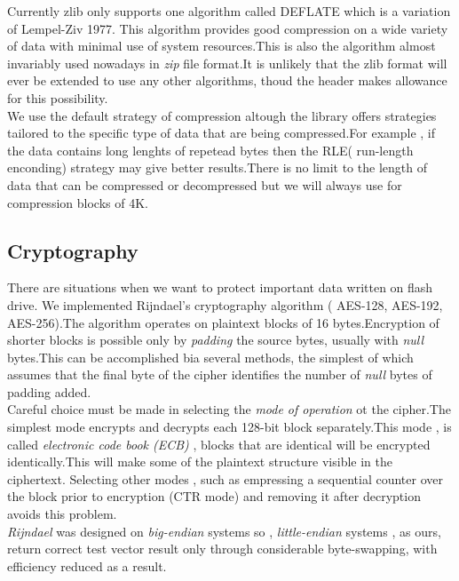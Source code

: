 \documentclass[conference]{IEEEtran}
\begin{document}
Currently zlib only supports one algorithm called DEFLATE which is a variation of Lempel-Ziv 1977. This algorithm 
provides good compression on a wide variety of data with minimal use of system resources.This is also the algorithm
almost invariably used nowadays in {\em zip} file format.It is unlikely that the zlib format will ever be extended
to use any other algorithms, thoud the header makes allowance for this possibility. \\

We use the default strategy of compression altough the library offers strategies tailored to the specific type
of data that are being compressed.For example , if the data contains long lenghts of repetead bytes then 
the RLE( run-length enconding) strategy may give better results.There is no limit to the length of data that
can be compressed or decompressed but we will always use for compression blocks of 4K.



\subsection{Cryptography}
There are situations when we want to protect important data written on flash drive. We implemented Rijndael's cryptography 
algorithm ( AES-128, AES-192, AES-256).The algorithm operates on plaintext blocks of 16 bytes.Encryption of
shorter blocks is possible only by {\em padding} the source bytes, usually with {\em null} bytes.This can 
be accomplished bia several methods, the simplest of which assumes that the final byte of the cipher identifies
the number of {\em null} bytes of padding added.\\

Careful choice must be made in selecting the {\em mode of operation} ot the cipher.The simplest mode encrypts
and decrypts each 128-bit block separately.This mode , is called {\em electronic code book (ECB) }, blocks
that are identical will be encrypted identically.This will make some of the plaintext structure visible in the 
ciphertext. Selecting other modes , such as empressing a sequential counter over the block prior to encryption
(CTR mode) and removing it after decryption avoids this problem. \\

{\em Rijndael} was designed on {\em big-endian} systems so , {\em little-endian} systems , as ours, return 
correct test vector result only through considerable byte-swapping, with efficiency reduced as a result.
\end{document}
